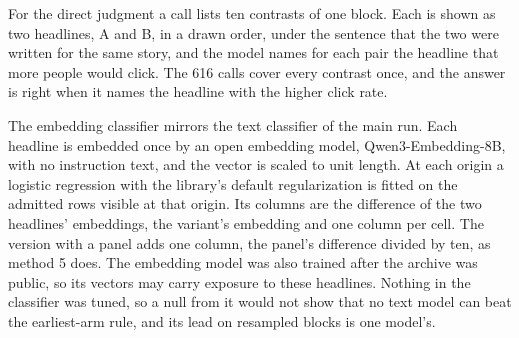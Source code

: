 For the direct judgment a call lists ten contrasts of one block. Each is shown as two headlines, A and B, in a drawn order, under the sentence that the two were written for the same story, and the model names for each pair the headline that more people would click. The 616 calls cover every contrast once, and the answer is right when it names the headline with the higher click rate.

The embedding classifier mirrors the text classifier of the main run. Each headline is embedded once by an open embedding model, Qwen3-Embedding-8B, with no instruction text, and the vector is scaled to unit length. At each origin a logistic regression with the library's default regularization is fitted on the admitted rows visible at that origin. Its columns are the difference of the two headlines' embeddings, the variant's embedding and one column per cell. The version with a panel adds one column, the panel's difference divided by ten, as method 5 does. The embedding model was also trained after the archive was public, so its vectors may carry exposure to these headlines. Nothing in the classifier was tuned, so a null from it would not show that no text model can beat the earliest-arm rule, and its lead on resampled blocks is one model's.

\begin{table}[t]\centering\footnotesize
\caption{The three readings of the simulated readers with the seven quarters as the units, added after the results of both runs. Each cell is the mean of the seven quarterly differences in direction accuracy with a Student-t interval at the Bonferroni level for the three readings, and the column \emph{above} counts the quarters whose difference is above zero. For the second and third readings the first quarter is zero by construction, because no earlier scored test exists there, and it still counts as a unit. The quarters are of unequal size and each counts once. The interval treats the seven values as exchangeable, with the limits that Section~\ref{sec:ladder-results} states. No cell carries a verdict word: the fixed words of Table~\ref{tab:fmt-readers-readings} rest on intervals over resampled blocks.}
\label{tab:fmt-readers-quarters}

\end{table}

